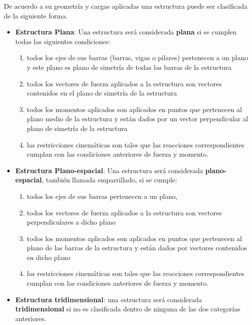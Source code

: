 De acuerdo a su geometría y cargas aplicadas una estructura puede ser clasificada de la siguiente forma.
%
\begin{itemize}
  \item \textbf{Estructura Plana}: Una estructura será considerada \textbf{plana} si se cumplen todas las siguientes condiciones:
    \begin{enumerate}
       \item todos los ejes de sus barras (barras, vigas o pilares) pertenecen a un plano y este plano es plano de simetría de todas las barras de la estructura
       \item todos los vectores de fuerza aplicados a la estructura son vectores contenidos en el plano de simetría de la estructura
       \item todos los momentos aplicados son aplicados en puntos que pertenecen al plano medio de la estructura y están dados por un vector perpendicular al plano de simetría de la estructura
       \item las restricciones cinemáticas son tales que las reacciones correspondientes cumplan con las condiciones anteriores de fuerza y momento.
    \end{enumerate}
  \item \textbf{Estructura Plano-espacial}: Una estructura será considerada \textbf{plano-espacial}, también llamada emparrillado, si se cumple: 
    \begin{enumerate}
	\item todos los ejes de sus barras pertenecen a un plano,
	\item todos los vectores de fuerza aplicados a la estructura son vectores perpendiculares a dicho plano
	\item todos los momentos aplicados son aplicados en puntos que pertenecen al plano de las barras de la estructura y están dados por vectores contenidos en dicho plano
	\item las restricciones cinemáticas son tales que las reacciones correspondientes cumplan con las condiciones anteriores de fuerza y momento.
\end{enumerate}
  
  \item \textbf{Estructura tridimensional}: una estructura será considerada \textbf{tridimensional} si no es clasificada dentro de ninguna de las dos categorías anteriores.
\end{itemize}








